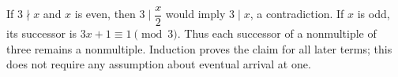 If $3\nmid x$ and $x$ is even, then $3\mid\dfrac{x}{2}$ would imply $3\mid x$, a contradiction. If $x$ is odd, its successor is $3x+1\equiv1\pmod3$. Thus each successor of a nonmultiple of three remains a nonmultiple. Induction proves the claim for all later terms; this does not require any assumption about eventual arrival at one.
